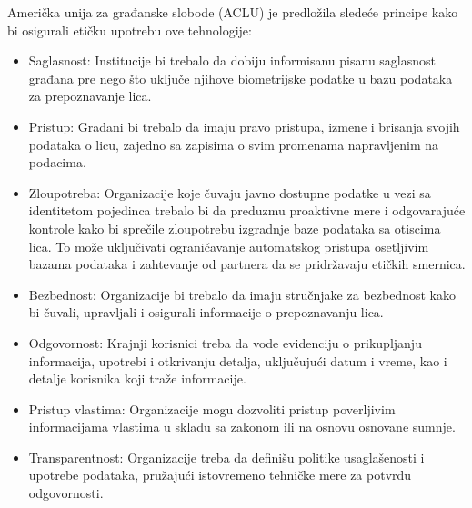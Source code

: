 \documentclass{article}
\begin{document}
Američka unija za građanske slobode (ACLU) je predložila sledeće principe kako bi osigurali etičku upotrebu ove tehnologije:
\begin{itemize}
    \item Saglasnost: Institucije bi trebalo da dobiju informisanu pisanu saglasnost građana pre nego što uključe njihove biometrijske podatke u bazu podataka za prepoznavanje lica.
    \item Pristup: Građani bi trebalo da imaju pravo pristupa, izmene i brisanja svojih podataka o licu, zajedno sa zapisima o svim promenama napravljenim na podacima.
    \item Zloupotreba: Organizacije koje čuvaju javno dostupne podatke u vezi sa identitetom pojedinca trebalo bi da preduzmu proaktivne mere i odgovarajuće kontrole kako bi sprečile zloupotrebu izgradnje baze podataka sa otiscima lica. To može uključivati ograničavanje automatskog pristupa osetljivim bazama podataka i zahtevanje od partnera da se pridržavaju etičkih smernica.
    \item Bezbednost: Organizacije bi trebalo da imaju stručnjake za bezbednost kako bi čuvali, upravljali i osigurali informacije o prepoznavanju lica.
    \item Odgovornost: Krajnji korisnici treba da vode evidenciju o prikupljanju informacija, upotrebi i otkrivanju detalja, uključujući datum i vreme, kao i detalje korisnika koji traže informacije.
    \item Pristup vlastima: Organizacije mogu dozvoliti pristup poverljivim informacijama vlastima u skladu sa zakonom ili na osnovu osnovane sumnje.
    \item  Transparentnost: Organizacije treba da definišu politike usaglašenosti i upotrebe podataka, pružajući istovremeno tehničke mere za potvrdu odgovornosti.

\end{itemize}
\newpage
\end{document}
